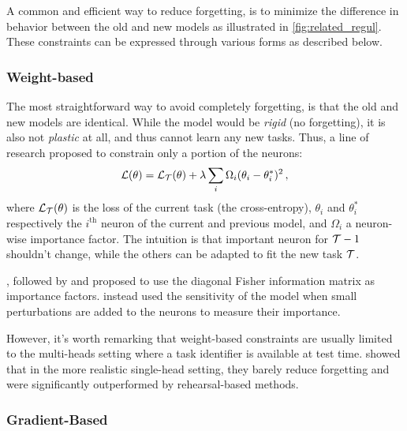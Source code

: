 A common and efficient way to reduce forgetting, is to minimize the difference in behavior between
the old and new models as illustrated in \autoref{fig:related_regul}. These constraints can be
expressed through various forms as described below.

\subsubsection{Weight-based}
\label{sec:related_regul_weight}


The most straightforward way to avoid completely forgetting, is that the old and new
models are identical. While the model would be \textit{rigid} (no forgetting), it is also not
\textit{plastic} at all, and thus cannot learn any new tasks. Thus, a line of research proposed to
constrain only a portion of the neurons:
%
\begin{equation}
    \mathcal{L}(\theta) = \mathcal{L}_{\mathcal{T}}(\theta) + \lambda \sum_i \Omega_i (\theta_i - \theta_i^*)^2\,,
    \label{eq:related_weight_constraint}
\end{equation}
%
where $\mathcal{L}_{\mathcal{T}}(\theta)$ is the loss of the current task (\eg the cross-entropy), $\theta_i$ and
$\theta_i^*$ respectively the $i^\text{th}$ neuron of the current and previous model, and $\Omega_i$
a neuron-wise importance factor. The intuition is that important neuron for $\mathcal{T}-1$ shouldn't
change, while the others can be adapted to fit the new task $\mathcal{T}$.

\cite{kirkpatrick2017ewc}, followed by
\cite{zenke2017synaptic_intelligence} and \cite{chaudhry2018riemannien_walk}
proposed to use the diagonal Fisher information matrix as importance factors.
\cite{aljundi2018MemoryAwareSynapses} instead used the sensitivity of the model when
small perturbations are added to the neurons to measure their importance.

However, it's worth remarking that weight-based constraints are usually limited to the multi-heads
setting where a task identifier is available at test time. \cite{lesort2019regulshortcomings} showed
that in the more realistic single-head setting, they barely reduce forgetting and were significantly
outperformed by rehearsal-based methods.

\subsubsection{Gradient-Based}
\label{sec:related_regul_gradient}

